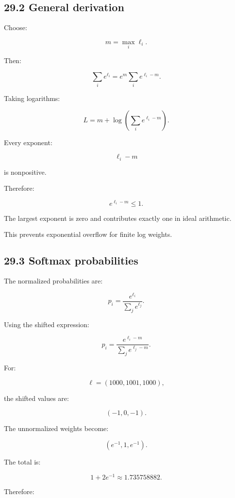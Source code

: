 \subsection{29.2 General derivation}\label{02-foundations-ii-ch031-general-derivation}

\hypertarget{02-foundations-ii-ch031-general-derivation}{}

Choose:

\[ m=\max_i\ell_i. \]

Then:

\[ \sum_ie^{\ell_i} = e^m\sum_ie^{\ell_i-m}. \]

Taking logarithms:

\[ \boxed{ L= m+\log\left( \sum_ie^{\ell_i-m} \right) }. \]

Every exponent:

\[ \ell_i-m \]

is nonpositive.

Therefore:

\[ e^{\ell_i-m}\le1. \]

The largest exponent is zero and contributes exactly one in ideal arithmetic.

This prevents exponential overflow for finite log weights.

\subsection{29.3 Softmax probabilities}\label{02-foundations-ii-ch031-softmax-probabilities}

\hypertarget{02-foundations-ii-ch031-softmax-probabilities}{}

The normalized probabilities are:

\[ \boxed{ p_i= \frac{e^{\ell_i}} {\sum_je^{\ell_j}} }. \]

Using the shifted expression:

\[ \boxed{ p_i= \frac{e^{\ell_i-m}} {\sum_je^{\ell_j-m}} }. \]

For:

\[ \ell=(1000,1001,1000), \]

the shifted values are:

\[ (-1,0,-1). \]

The unnormalized weights become:

\[ (e^{-1},1,e^{-1}). \]

The total is:

\[ 1+2e^{-1}\approx1.735758882. \]

Therefore:

